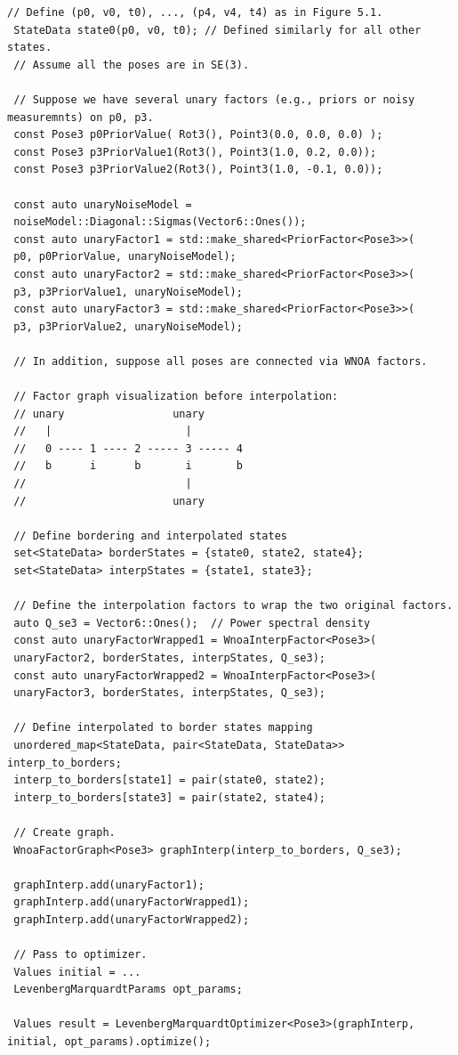 \documentclass[border=1pt]{standalone}
\begin{document}
\begin{listingbox}
\begin{lstlisting}[style=C++Style]
 // Define (p0, v0, t0), ..., (p4, v4, t4) as in Figure 5.1.
 StateData state0(p0, v0, t0); // Defined similarly for all other states.
 // Assume all the poses are in SE(3).
	
 // Suppose we have several unary factors (e.g., priors or noisy measuremnts) on p0, p3.
 const Pose3 p0PriorValue( Rot3(), Point3(0.0, 0.0, 0.0) );  
 const Pose3 p3PriorValue1(Rot3(), Point3(1.0, 0.2, 0.0));   
 const Pose3 p3PriorValue2(Rot3(), Point3(1.0, -0.1, 0.0));   
	
 const auto unaryNoiseModel = 
 noiseModel::Diagonal::Sigmas(Vector6::Ones());
 const auto unaryFactor1 = std::make_shared<PriorFactor<Pose3>>(
 p0, p0PriorValue, unaryNoiseModel);
 const auto unaryFactor2 = std::make_shared<PriorFactor<Pose3>>(
 p3, p3PriorValue1, unaryNoiseModel);
 const auto unaryFactor3 = std::make_shared<PriorFactor<Pose3>>(
 p3, p3PriorValue2, unaryNoiseModel);
	
 // In addition, suppose all poses are connected via WNOA factors.
	
 // Factor graph visualization before interpolation:
 // unary                 unary
 //   |                     |
 //   0 ---- 1 ---- 2 ----- 3 ----- 4
 //   b      i      b       i       b
 //                         |         
 //                       unary
	
 // Define bordering and interpolated states
 set<StateData> borderStates = {state0, state2, state4};
 set<StateData> interpStates = {state1, state3};
	
 // Define the interpolation factors to wrap the two original factors.
 auto Q_se3 = Vector6::Ones();  // Power spectral density
 const auto unaryFactorWrapped1 = WnoaInterpFactor<Pose3>(
 unaryFactor2, borderStates, interpStates, Q_se3);
 const auto unaryFactorWrapped2 = WnoaInterpFactor<Pose3>(
 unaryFactor3, borderStates, interpStates, Q_se3);
	
 // Define interpolated to border states mapping
 unordered_map<StateData, pair<StateData, StateData>> interp_to_borders;
 interp_to_borders[state1] = pair(state0, state2);
 interp_to_borders[state3] = pair(state2, state4);

 // Create graph.
 WnoaFactorGraph<Pose3> graphInterp(interp_to_borders, Q_se3);

 graphInterp.add(unaryFactor1);
 graphInterp.add(unaryFactorWrapped1);
 graphInterp.add(unaryFactorWrapped2);

 // Pass to optimizer.
 Values initial = ...
 LevenbergMarquardtParams opt_params;

 Values result = LevenbergMarquardtOptimizer<Pose3>(graphInterp, initial, opt_params).optimize();

\end{lstlisting}
\end{listingbox}
\end{document}
